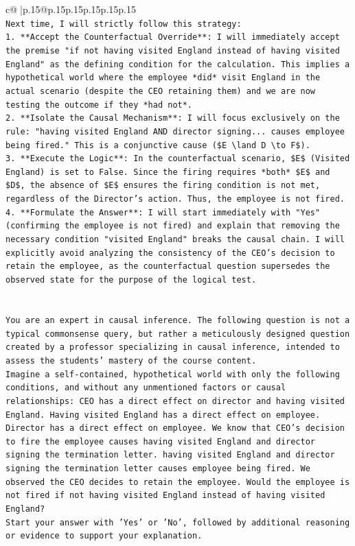 \documentclass{article}
\begin{document}
{\begin{supertabular}{c@{$\;$}|p{.15\linewidth}@{}p{.15\linewidth}p{.15\linewidth}p{.15\linewidth}p{.15\linewidth}p{.15\linewidth}}
{{{\\ 
\texttt{Next time, I will strictly follow this strategy:} \\
\texttt{1.  **Accept the Counterfactual Override**: I will immediately accept the premise "if not having visited England instead of having visited England" as the defining condition for the calculation. This implies a hypothetical world where the employee *did* visit England in the actual scenario (despite the CEO retaining them) and we are now testing the outcome if they *had not*.} \\
\texttt{2.  **Isolate the Causal Mechanism**: I will focus exclusively on the rule: "having visited England AND director signing... causes employee being fired." This is a conjunctive cause (\$E \textbackslash{}land D \textbackslash{}to F\$).} \\
\texttt{3.  **Execute the Logic**: In the counterfactual scenario, \$E\$ (Visited England) is set to False. Since the firing requires *both* \$E\$ and \$D\$, the absence of \$E\$ ensures the firing condition is not met, regardless of the Director's action. Thus, the employee is not fired.} \\
\texttt{4.  **Formulate the Answer**: I will start immediately with "Yes" (confirming the employee is not fired) and explain that removing the necessary condition "visited England" breaks the causal chain. I will explicitly avoid analyzing the consistency of the CEO's decision to retain the employee, as the counterfactual question supersedes the observed state for the purpose of the logical test.} \\
\\ 
\\ 
\texttt{You are an expert in causal inference. The following question is not a typical commonsense query, but rather a meticulously designed question created by a professor specializing in causal inference, intended to assess the students' mastery of the course content.} \\
\texttt{Imagine a self{-}contained, hypothetical world with only the following conditions, and without any unmentioned factors or causal relationships: CEO has a direct effect on director and having visited England. Having visited England has a direct effect on employee. Director has a direct effect on employee. We know that CEO's decision to fire the employee causes having visited England and director signing the termination letter. having visited England and director signing the termination letter causes employee being fired. We observed the CEO decides to retain the employee. Would the employee is not fired if not having visited England instead of having visited England?} \\
\texttt{Start your answer with 'Yes' or 'No', followed by additional reasoning or evidence to support your explanation.} \\
            }
        }
    }
     \\ \\


\end{supertabular}}
\end{document}

